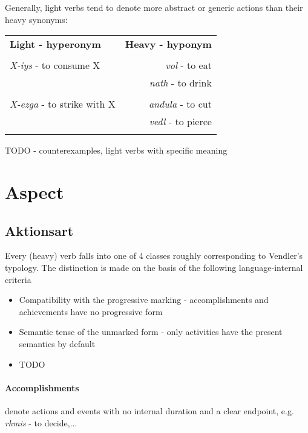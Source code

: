 \documentclass[8pt]{book}
\begin{document}
Generally, light verbs tend to denote more abstract or generic actions than their heavy synonyms:

\begin{tabular}{l r}

\textbf{Light - hyperonym} & \textbf{Heavy - hyponym} \\\\

\textit{X-iys} - to consume X & \textit{vol} - to eat \\
                              & \textit{nath} - to drink \\\\
                              

\textit{X-ezga} - to strike with X & \textit{andula} - to cut \\
                                   & \textit{vedl} - to pierce \\\\
\end{tabular}


TODO - counterexamples, light verbs with specific meaning


\section{Aspect}
\subsection{Aktionsart}

Every (heavy) verb falls into one of 4 classes roughly corresponding to Vendler's typology. The distinction is made on the basis of the following language-internal criteria

\begin{itemize}
	\item Compatibility with the progressive marking - accomplishments and achievements have no progressive form
	\item Semantic tense of the unmarked form - only activities have the present semantics by default
	\item TODO
\end{itemize}

\paragraph{Accomplishments} 
denote actions and events with no internal duration and a clear endpoint, e.g. \textit{rhmis} - to decide,...
\end{document}
